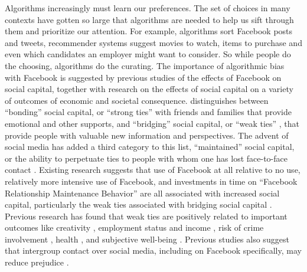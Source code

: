 \documentclass[12pt,letterpaper]{article}
\begin{document}
Algorithms increasingly must learn our preferences. The set of choices in many contexts have gotten so large that algorithms are needed to help us sift through them and prioritize our attention. For example, algorithms sort Facebook posts and tweets, recommender systems suggest movies to watch, items to purchase and even which candidates an employer might want to consider. So while people do the choosing, algorithms do the curating.  
The importance of algorithmic bias with Facebook is suggested by previous studies of the effects of Facebook on social capital, together with research on the effects of social capital on a variety of outcomes of economic and societal consequence. \citep{putnam2000bowling} distinguishes between “bonding” social capital, or “strong ties” with friends and families that provide emotional and other supports, and “bridging” social capital, or “weak ties” \citep{granovetter1973strength}, that provide people with valuable new information and perspectives. The advent of social media has added a third category to this list, “maintained” social capital, or the ability to perpetuate ties to people with whom one has lost face-to-face contact \citep{ellison2007benefits}. Existing research suggests that use of Facebook at all relative to no use, relatively more intensive use of Facebook, and investments in time on “Facebook Relationship Maintenance Behavior” are all associated with increased social capital, particularly the weak ties associated with bridging social capital \citep{antheunis2015impact}. Previous research has found that weak ties are positively related to important outcomes like creativity \citep{baer2010strength}, employment status and income \citep{tassier2006labor}, risk of crime involvement \citep{patacchini2008strength}, health \citep{kawachi2000social}, and subjective well-being \citep{sandstrom2014social}. Previous studies also suggest that intergroup contact over social media, including on Facebook specifically, may reduce prejudice \citep{ALVIDREZ2015533} \citep{schwab2019intergroup}. 
\end{document}

